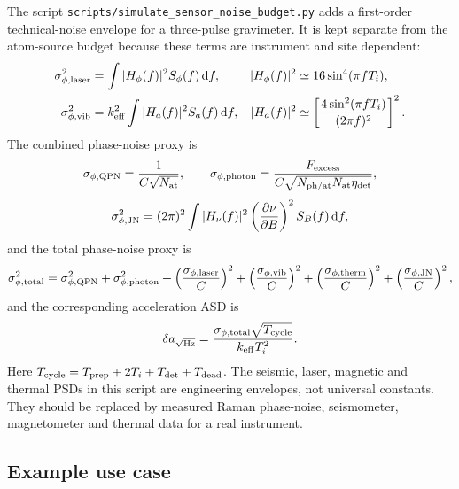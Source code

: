 \documentclass[11pt,a4paper]{article}
\begin{document}
The script \texttt{scripts/simulate\_sensor\_noise\_budget.py} adds a
first-order technical-noise envelope for a three-pulse gravimeter. It is kept
separate from the atom-source budget because these terms are instrument and
site dependent:
\begin{align}
\sigma_{\phi,\rm laser}^2
&=\int |H_\phi(f)|^2S_\phi(f)\,\mathrm df,
&
|H_\phi(f)|^2&\simeq16\sin^4(\pi fT_i),
\\
\sigma_{\phi,\rm vib}^2
&=k_{\rm eff}^2\int |H_a(f)|^2S_a(f)\,\mathrm df,
&
|H_a(f)|^2&\simeq
\left[\frac{4\sin^2(\pi fT_i)}{(2\pi f)^2}\right]^2.
\end{align}
The combined phase-noise proxy is
\begin{equation}
\sigma_{\phi,\rm QPN}=\frac{1}{C\sqrt{N_{\rm at}}},
\qquad
\sigma_{\phi,\rm photon}=
\frac{F_{\rm excess}}{C\sqrt{N_{\rm ph/at}N_{\rm at}\eta_{\rm det}}},
\end{equation}
\begin{equation}
\sigma_{\phi,\rm JN}^2=(2\pi)^2
\int |H_\nu(f)|^2\left(\frac{\partial\nu}{\partial B}\right)^2S_B(f)\,\mathrm df,
\end{equation}
and the total phase-noise proxy is
\begin{equation}
\sigma_{\phi,\rm total}^2
=\sigma_{\phi,\rm QPN}^2+\sigma_{\phi,\rm photon}^2
+\left(\frac{\sigma_{\phi,\rm laser}}{C}\right)^2
+\left(\frac{\sigma_{\phi,\rm vib}}{C}\right)^2
+\left(\frac{\sigma_{\phi,\rm therm}}{C}\right)^2
+\left(\frac{\sigma_{\phi,\rm JN}}{C}\right)^2,
\end{equation}
and the corresponding acceleration ASD is
\begin{equation}
\delta a_{\sqrt{\rm Hz}}
=\frac{\sigma_{\phi,\rm total}\sqrt{T_{\rm cycle}}}
{k_{\rm eff}T_i^2}.
\end{equation}
Here $T_{\rm cycle}=T_{\rm prep}+2T_i+T_{\rm det}+T_{\rm dead}$.
The seismic, laser, magnetic and thermal PSDs in this script are engineering
envelopes, not universal constants. They should be replaced by measured Raman
phase-noise, seismometer, magnetometer and thermal data for a real instrument.

\subsection{Example use case}
\end{document}
